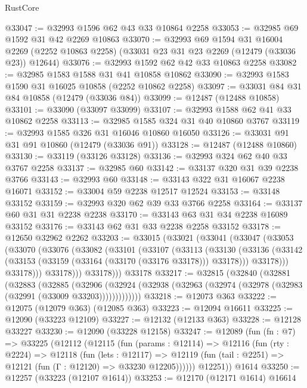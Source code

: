 \begin{lexlean}{RustCore}
\begin{coremodule}
@33047 := @32993 @1596 @62 @43 @33 @10864 @2258
@33053 := @32985 @69 @1592 @31 @42 @2269 @10863
@33070 := @32993
    @69
    @1594
    @31
    @16004
    @2269
    (@2252 @10863 @2258)
    (@33031 @23 @31 @23 @2269 (@12479 (@33036 @23)) @12644)
@33076 := @32993 @1592 @62 @42 @33 @10863 @2258
@33082 := @32985 @1583 @1588 @31 @41 @10858 @10862
@33090 := @32993 @1583 @1590 @31 @16025 @10858 (@2252 @10862 @2258)
@33097 := @33031 @84 @31 @84 @10858 (@12479 (@33036 @84))
@33099 := @12487 (@12488 @10858)
@33101 := @33090 (@33097 @33099)
@33107 := @32993 @1588 @62 @41 @33 @10862 @2258
@33113 := @32985 @1585 @324 @31 @40 @10860 @3767
@33119 := @32993 @1585 @326 @31 @16046 @10860 @16050
@33126 := @33031 @91 @31 @91 @10860 (@12479 (@33036 @91))
@33128 := @12487 (@12488 @10860)
@33130 := @33119 (@33126 @33128)
@33136 := @32993 @324 @62 @40 @33 @3767 @2258
@33137 := @32985 @60
@33142 := @33137 @320 @31 @39 @2238 @3766
@33143 := @32993 @60
@33148 := @33143 @322 @31 @16067 @2238 @16071
@33152 := @33004 @59 @2238 @12517 @12524
@33153 := @33148 @33152
@33159 := @32993 @320 @62 @39 @33 @3766 @2258
@33164 := @33137 @60 @31 @31 @2238 @2238
@33170 := @33143 @63 @31 @34 @2238 @16089 @33152
@33176 := @33143 @62 @31 @33 @2238 @2258 @33152
@33178 := @12650 @32962 @2262
@33203 := @33015
    (@33021
      (@33041
        (@33047
          (@33053
            (@33070
              (@33076
                (@33082
                  (@33101
                    (@33107
                      (@33113
                        (@33130
                          (@33136
                            (@33142 (@33153 (@33159 (@33164 (@33170 (@33176 @33178))) @33178)))
                            @33178)))
                      @33178)))
                @33178)))
          @33178)))
    @33178
@33217 := @32815
    (@32840
      (@32881
        (@32883
          (@32885
            (@32906
              (@32924 (@32938 (@32963 (@32974 (@32978 (@32983 (@32991 (@33009 @33203)))))))))))))
@33218 := @12073 @363
@33222 := @12075 (@12079 @363) (@12085 @363)
@33223 := @12094 @16611
@33225 := @12090 (@33223 @12109)
@33227 := @12132 (@12133 @363)
@33228 := @12128 @33227
@33230 := @12090 (@33228 @12158)
@33247 := @12089
    (fun (fn : @7) =>
    @33225
      (@12112
        (@12115
          (fun (params : @12114) =>
          @12116
            (fun (rty : @2224) =>
            @12118
              (fun (lets : @12117) =>
              @12119 (fun (tail : @2251) => @12121 (fun (Γ : @12120) => @33230 @12205))))))
        @12251))
    @1614
@33250 := @12257 (@33223 (@12107 @1614))
@33253 := @12170 (@12171 @1614) @16614

\end{coremodule}
\end{lexlean}
